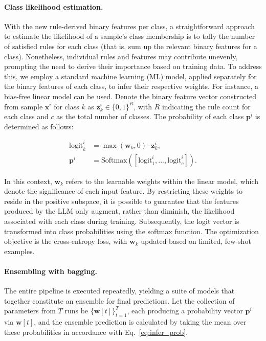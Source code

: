 \vspace*{-0.12in}
\paragraph{Class likelihood estimation.} With the new rule-derived binary features per class, a straightforward approach to estimate the likelihood of a sample’s class membership is to tally the number of satisfied rules for each class (that is, sum up the relevant binary features for a class). Nonetheless, individual rules and features may contribute unevenly, prompting the need to derive their importance based on training data. To address this, we employ a standard machine learning (ML) model, applied separately for the binary features of each class, to infer their respective weights. For instance, a bias-free linear model can be used. Denote the binary feature vector constructed from sample $\mathbf{x}^i$ for class $k$ as $\mathbf{z}_k^i \in \{0, 1\}^R$, with $R$ indicating the rule count for each class and $c$ as the total number of classes. The probability of each class $\mathbf{p}^i$ is determined as follows:

\begin{align}
\text{logit}_k^i &= \max(\mathbf{w}_k, 0) \cdot \mathbf{z}_k^i, \nonumber \\
\mathbf{p}^i &= \text{Softmax}({[\text{logit}_{1}^i, ..., \text{logit}_{c}^i]}). \label{eq:infer_prob}
\end{align}

In this context, $\mathbf{w}_k$ refers to the learnable weights within the linear model, which denote the significance of each input feature. By restricting these weights to reside in the positive subspace, it is possible to guarantee that the features produced by the LLM only augment, rather than diminish, the likelihood associated with each class during training. Subsequently, the logit vector is transformed into class probabilities using the softmax function. The optimization objective is the cross-entropy loss, with $\mathbf{w}_k$ updated based on limited, few-shot examples.

\vspace*{-0.12in}
\paragraph{Ensembling with bagging.} The entire pipeline is executed repeatedly, yielding a suite of models that together constitute an ensemble for final predictions. Let the collection of parameters from $T$ runs be $\{\mathbf{w}[t]\}_{t=1}^T$, each producing a probability vector $\mathbf{p}^i$ via $\mathbf{w}[t]$, and the ensemble prediction is calculated by taking the mean over these probabilities in accordance with Eq.~\ref{eq:infer_prob}.

